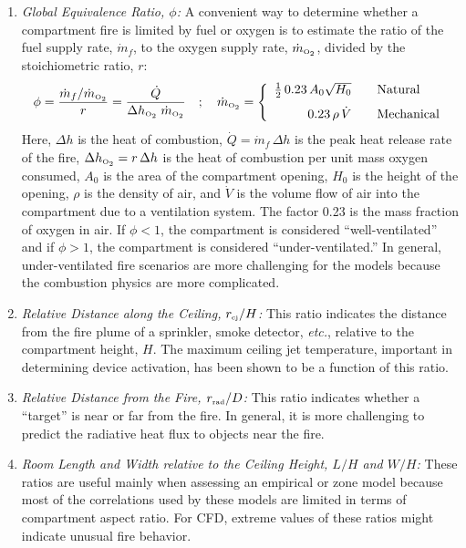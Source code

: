 \documentclass[graybox]{svmult}
\begin{document}
\begin{enumerate}
\item {\em Global Equivalence Ratio, $\phi$:}
A convenient way to determine whether a compartment fire is limited by fuel or oxygen is to estimate the ratio of the fuel supply rate, $\dot{m}_f$, to the oxygen supply rate, $\dot{m}_{\hbox{\tiny O$_2$}}$, divided by the stoichiometric ratio, $r$:
\begin{equation}
   \phi = \frac{\dot{m}_f/\dot{m}_{\hbox{\tiny O$_2$}}}{r} = \frac{\dot{Q}}{\Delta h_{\hbox{\tiny O$_2$}} \; \dot{m}_{\hbox{\tiny O$_2$}} } \quad ; \quad  \dot{m}_{\hbox{\tiny O$_2$}} = \left\{
   \begin{array}{r@{\quad \quad}l}
      \frac{1}{2} \, 0.23 \, A_0 \sqrt{H_0} & \hbox{Natural} \\ [0.1in]
      0.23 \, \rho \, \dot{V}       & \hbox{Mechanical} \end{array} \right.
\end{equation}
Here, $\Delta h$ is the heat of combustion, $\dot{Q}=\dot{m}_f \, \Delta h$ is the peak heat release rate of the fire, $\Delta h_{\hbox{\tiny O$_2$}}=r \, \Delta h$ is the heat of combustion per unit mass oxygen consumed, $A_0$ is the area of the compartment opening, $H_0$ is the height of the opening, $\rho$ is the density of air, and $\dot{V}$ is the volume flow of air into the compartment due to a ventilation system. The factor 0.23 is the mass fraction of oxygen in air. If $\phi<1$, the compartment is considered ``well-ventilated'' and if $\phi>1$, the compartment is considered ``under-ventilated.'' In general, under-ventilated fire scenarios are more challenging for the models because the combustion physics are more complicated.

\item {\em Relative Distance along the Ceiling, $r_{\hbox{\tiny cj}}/H$:}
This ratio indicates the distance from the fire plume of a sprinkler, smoke detector, {\em etc.}, relative to the
compartment height, $H$. The maximum ceiling jet temperature, important  in determining device activation, has been shown to be a function of this ratio.

\item {\em Relative Distance from the Fire, $r_{\hbox{\tiny rad}}/D$:}
This ratio indicates whether a ``target'' is near or far from the fire. In general, it is more challenging to predict the
radiative heat flux to objects near the fire.

\item {\em Room Length and Width relative to the Ceiling Height, $L/H$ and $W/H$:}
These ratios are useful mainly when assessing an empirical or zone model because most of the correlations used
by these models are limited in terms of compartment aspect ratio. For CFD, extreme values of these ratios might indicate unusual fire behavior.


\end{enumerate}
\end{document}
